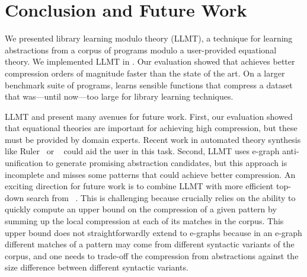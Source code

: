 \section{Conclusion and Future Work}

We presented library learning modulo theory (LLMT),
 a technique for learning abstractions from a corpus of programs
 modulo a user-provided equational theory.
We implemented LLMT in \tool.
Our evaluation showed that \tool
 achieves better compression orders of magnitude faster
 than the state of the art.
On a larger benchmark suite of \cogsci programs,
 \tool learns sensible functions that
 compress a dataset that was---until now---too large for library learning techniques.

LLMT and \tool present many avenues for future work.
First,
 our evaluation showed that equational theories are important
 for achieving high compression,
 but these must be provided by domain experts.
Recent work in automated theory synthesis like
 Ruler~\cite{ruler} or ~\cite{thesy}
 could aid the user in this task.
Second,
 LLMT uses e-graph anti-unification to generate
 promising abstraction candidates, 
 but this approach is incomplete and misses some patterns
 that could achieve better compression.
An exciting direction for future work is to combine LLMT 
with more efficient top-down search from \stitch~\cite{stitch}.
%
This is challenging because \stitch crucially relies on the ability 
to quickly compute an upper bound on the compression of a given pattern 
by summing up the local compression at each of its matches in the corpus.
%
This upper bound does not straightforwardly extend to e-graphs
because in an e-graph different matches of a pattern may come from different syntactic variants of the corpus,
and one needs to trade-off the compression from abstractions
against the size difference between different syntactic variants.